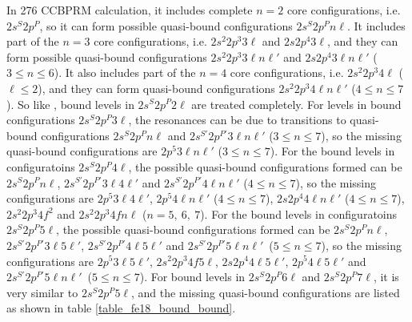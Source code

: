 In  276 CCBPRM calculation, it includes complete $n=2$ core configurations, i.e. $2s^S  2p^P$, so it can form possible quasi-bound configurations $2s^S  2p^P n\ell$. It includes part of the $n=3$ core configurations, i.e. $2s^2 2p^3 3\ell$ and $2s 2p^4 3\ell$, and they can form possible quasi-bound configurations $2s^2 2p^3 3\ell n\ell'$ and $2s 2p^4 3\ell n\ell'$ ($3 \leq n \leq 6$). It also includes part of the $n=4$ core configurations, i.e. $2s^2 2p^3 4\ell$ ($\ell \leq 2$), and they can form quasi-bound configurations $2s^2 2p^3 4\ell n\ell'$ ($4 \leq n \leq 7$). So like , bound levels in $2s^S 2p^P 2\ell$ are treated completely. For levels in bound configurations $2s^S 2p^P 3\ell$, the resonances can be due to transitions to quasi-bound configurations $2s^S 2p^P n\ell$ and  $2s^{S'} 2p^{P'} 3\ell n\ell'$ ($3 \leq n \leq 7$), so the missing quasi-bound configurations are $2p^5 3\ell n\ell'$ ($3 \leq n \leq 7$). For the bound levels in configuratoins $2s^S 2p^P 4\ell$, the possible quasi-bound configurations formed can be $2s^S 2p^P n\ell$, $2s^{S'} 2p^{P'} 3\ell 4\ell'$ and $2s^{S'} 2p^{P'} 4\ell n\ell'$ ($4 \leq n \leq 7$), so the missing configurations are $2p^5 3\ell 4\ell'$,  $2p^5 4\ell n\ell'$ ($4 \leq n \leq 7$), $2s 2p^4 4\ell n\ell'$ ($4 \leq n \leq 7$), $2s^2 2p^3 4f^2$ and $2s^2 2p^3 4f n\ell$ ($n = 5, ~6,~7$).  For the bound levels in configuratoins $2s^S 2p^P 5\ell$, the possible quasi-bound configurations formed can be $2s^S 2p^P n\ell$, $2s^{S'} 2p^{P'} 3\ell 5\ell'$, $2s^{S'} 2p^{P'} 4\ell 5\ell'$ and  $2s^{S'} 2p^{P'} 5\ell n\ell'$~($5 \leq n \leq 7$), so the missing configurations are $2p^5 3\ell 5\ell'$, $2s^2 2p^3 4f 5\ell$, $2s 2p^4 4\ell 5\ell'$, $2p^5 4\ell 5\ell'$ and $2s^{S'} 2p^{P'} 5\ell n\ell'$~($5 \leq n \leq 7$). For bound levels in $2s^S 2p^P 6\ell$ and  $2s^S 2p^P 7\ell$, it is very similar to $2s^S 2p^P 5\ell$, and the missing quasi-bound configurations are listed as shown in table \ref{table_fe18_bound_bound}.

